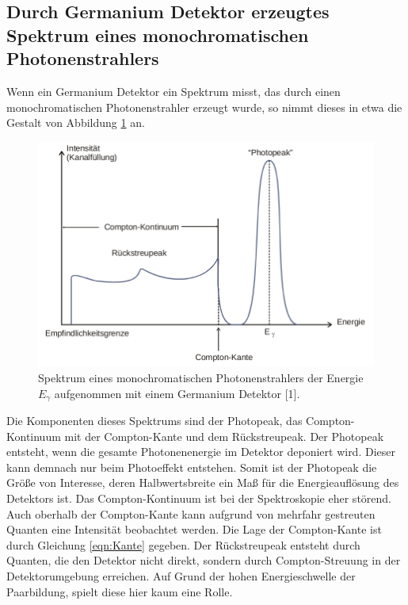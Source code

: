 \subsection{Durch Germanium Detektor erzeugtes Spektrum eines monochromatischen Photonenstrahlers}

Wenn ein Germanium Detektor ein Spektrum misst, das durch einen monochromatischen Photonenstrahler erzeugt wurde, so nimmt dieses in etwa die Gestalt von 
Abbildung \ref{fig:spektrum} an. 

\begin{figure}
    \centering
    \includegraphics[scale=0.3]{content/spektrum.png}
    \caption{Spektrum eines monochromatischen Photonenstrahlers der Energie $E_\gamma$ aufgenommen mit einem Germanium Detektor [1].}
    \label{fig:spektrum}
\end{figure}

Die Komponenten dieses Spektrums sind der Photopeak, das Compton-Kontinuum mit der Compton-Kante und dem Rückstreupeak. Der Photopeak entsteht, 
wenn die gesamte Photonenenergie im Detektor deponiert wird. Dieser kann demnach nur beim Photoeffekt entstehen. Somit ist der Photopeak die 
Größe von Interesse, deren Halbwertsbreite ein Maß für die Energieauflösung des Detektors ist. Das Compton-Kontinuum ist bei der Spektroskopie
eher störend. Auch oberhalb der Compton-Kante kann aufgrund von mehrfahr gestreuten Quanten eine Intensität beobachtet werden. Die Lage der 
Compton-Kante ist durch Gleichung \eqref{eqn:Kante} gegeben. Der Rückstreupeak entsteht durch Quanten, die den Detektor nicht direkt, sondern
durch Compton-Streuung in der Detektorumgebung erreichen. Auf Grund der hohen Energieschwelle der Paarbildung, spielt diese hier kaum eine 
Rolle. 

\cite{sample}
